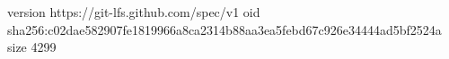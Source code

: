 version https://git-lfs.github.com/spec/v1
oid sha256:c02dae582907fe1819966a8ca2314b88aa3ea5febd67c926e34444ad5bf2524a
size 4299
